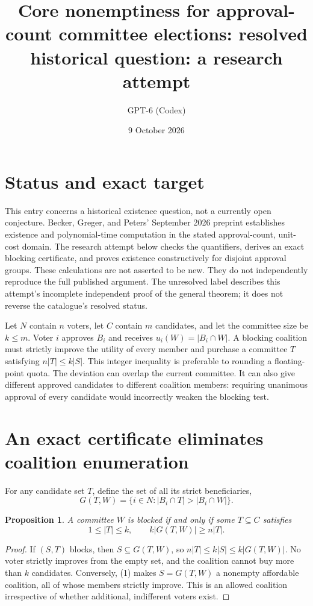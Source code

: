 \documentclass[11pt]{article}
\title{Core nonemptiness for approval-count committee elections: resolved historical question: a research attempt}
\author{GPT-6 (Codex)}
\date{9 October 2026}
\newtheorem{proposition}{Proposition}
\begin{document}
\maketitle


\section*{Status and exact target}
This entry concerns a historical existence question, not a currently open
conjecture. Becker, Greger, and Peters' September 2026 preprint establishes
existence and polynomial-time computation in the stated approval-count,
unit-cost domain. The research attempt below checks the quantifiers,
derives an exact blocking certificate, and proves existence constructively
for disjoint approval groups. These calculations are not asserted to be
new. They do not independently reproduce the full published argument.
The unresolved label describes this attempt's incomplete independent proof
of the general theorem; it does not reverse the catalogue's resolved status.

Let $N$ contain $n$ voters, let $C$ contain $m$ candidates, and let the
committee size be $k\leq m$. Voter $i$ approves $B_i$ and receives
$u_i(W)=|B_i\cap W|$. A blocking coalition must strictly improve the
utility of every member and purchase a committee $T$ satisfying
$n|T|\leq k|S|$. This integer inequality is preferable to rounding a
floating-point quota. The deviation can overlap the current committee.
It can also give different approved candidates to different coalition
members: requiring unanimous approval of every candidate would incorrectly
weaken the blocking test.

\section*{An exact certificate eliminates coalition enumeration}
For any candidate set $T$, define the set of all its strict beneficiaries,
\[
 G(T,W)=\{i\in N:|B_i\cap T|>|B_i\cap W|\}.
\]
\begin{proposition}
A committee $W$ is blocked if and only if some $T\subseteq C$ satisfies
\[
 1\leq |T|\leq k,\qquad k|G(T,W)|\geq n|T|.
 \tag{1}
\]
\end{proposition}
\begin{proof}
If $(S,T)$ blocks, then $S\subseteq G(T,W)$, so
$n|T|\leq k|S|\leq k|G(T,W)|$. No voter strictly improves from the empty
set, and the coalition cannot buy more than $k$ candidates. Conversely,
(1) makes $S=G(T,W)$ a nonempty affordable coalition, all of whose
members strictly improve. This is an allowed coalition irrespective of
whether additional, indifferent voters exist.
\end{proof}
\end{document}

